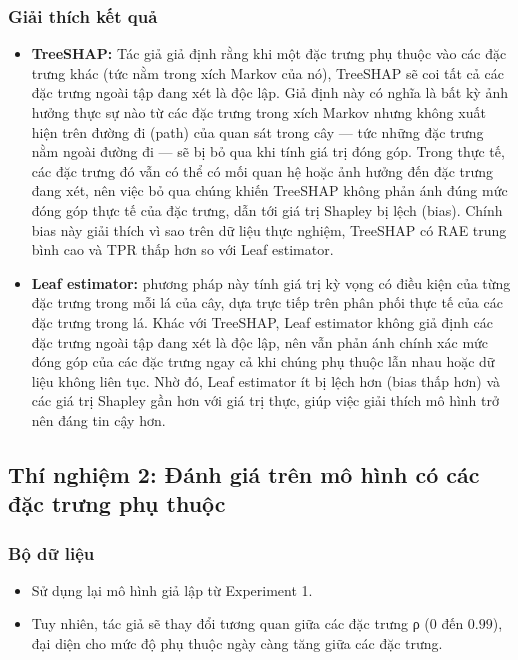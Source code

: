 \documentclass[12pt, a4paper]{article}
\theoremstyle{plain}
\theoremstyle{proposition}
\theoremstyle{lemma}
\begin{document}
\subsubsection{Giải thích kết quả}
        \begin{itemize}[align=parleft, left=4em, labelsep=1em, itemsep=0.5em]
            \item \textbf{TreeSHAP: }Tác giả giả định rằng khi một đặc trưng phụ thuộc vào các đặc trưng khác (tức nằm trong xích Markov của nó), TreeSHAP sẽ coi tất cả các đặc trưng ngoài tập đang xét là độc lập. Giả định này có nghĩa là bất kỳ ảnh hưởng thực sự nào từ các đặc trưng trong xích Markov nhưng không xuất hiện trên đường đi (path) của quan sát trong cây — tức những đặc trưng nằm ngoài đường đi — sẽ bị bỏ qua khi tính giá trị đóng góp. Trong thực tế, các đặc trưng đó vẫn có thể có mối quan hệ hoặc ảnh hưởng đến đặc trưng đang xét, nên việc bỏ qua chúng khiến TreeSHAP không phản ánh đúng mức đóng góp thực tế của đặc trưng, dẫn tới giá trị Shapley bị lệch (bias). Chính bias này giải thích vì sao trên dữ liệu thực nghiệm, TreeSHAP có RAE trung bình cao và TPR thấp hơn so với Leaf estimator.
    
            \item \textbf{Leaf estimator: }phương pháp này tính giá trị kỳ vọng có điều kiện của từng đặc trưng trong mỗi lá của cây, dựa trực tiếp trên phân phối thực tế của các đặc trưng trong lá. Khác với TreeSHAP, Leaf estimator không giả định các đặc trưng ngoài tập đang xét là độc lập, nên vẫn phản ánh chính xác mức đóng góp của các đặc trưng ngay cả khi chúng phụ thuộc lẫn nhau hoặc dữ liệu không liên tục. Nhờ đó, Leaf estimator ít bị lệch hơn (bias thấp hơn) và các giá trị Shapley gần hơn với giá trị thực, giúp việc giải thích mô hình trở nên đáng tin cậy hơn.
    
        \end{itemize}   

\subsection{Thí nghiệm 2: Đánh giá trên mô hình có các đặc trưng phụ thuộc}
\subsubsection{Bộ dữ liệu}
        \begin{itemize}[align=parleft, left=4em, labelsep=1em, itemsep=0.5em]
            \item Sử dụng lại mô hình giả lập từ Experiment 1.
            \item Tuy nhiên, tác giả sẽ thay đổi tương quan giữa các đặc trưng ρ ($0$ đến $0.99$), đại diện cho mức độ phụ thuộc ngày càng tăng giữa các đặc trưng.
        \end{itemize}
\end{document}
